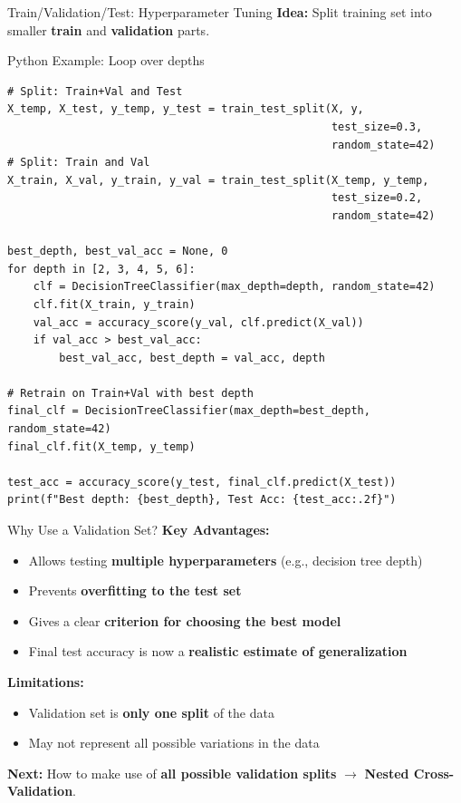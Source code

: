 \documentclass{beamer}
\begin{document}
	\begin{frame}[fragile]{Train/Validation/Test: Hyperparameter Tuning}
\textbf{Idea:} Split training set into smaller \textbf{train} and \textbf{validation} parts.

\begin{block}{Python Example: Loop over depths}
\tiny
\begin{verbatim}
# Split: Train+Val and Test
X_temp, X_test, y_temp, y_test = train_test_split(X, y,
                                                  test_size=0.3,
                                                  random_state=42)
# Split: Train and Val
X_train, X_val, y_train, y_val = train_test_split(X_temp, y_temp,
                                                  test_size=0.2,
                                                  random_state=42)

best_depth, best_val_acc = None, 0
for depth in [2, 3, 4, 5, 6]:
    clf = DecisionTreeClassifier(max_depth=depth, random_state=42)
    clf.fit(X_train, y_train)
    val_acc = accuracy_score(y_val, clf.predict(X_val))
    if val_acc > best_val_acc:
        best_val_acc, best_depth = val_acc, depth

# Retrain on Train+Val with best depth
final_clf = DecisionTreeClassifier(max_depth=best_depth, random_state=42)
final_clf.fit(X_temp, y_temp)

test_acc = accuracy_score(y_test, final_clf.predict(X_test))
print(f"Best depth: {best_depth}, Test Acc: {test_acc:.2f}")
\end{verbatim}
\end{block}
\end{frame}

\begin{frame}{Why Use a Validation Set?}
\textbf{Key Advantages:}
\begin{itemize}
    \item Allows testing \textbf{multiple hyperparameters} (e.g., decision tree depth)
    \item Prevents \textbf{overfitting to the test set}
    \item Gives a clear \textbf{criterion for choosing the best model}
    \item Final test accuracy is now a \textbf{realistic estimate of generalization}
\end{itemize}

\pause
\textbf{Limitations:}
\begin{itemize}
    \item Validation set is \textbf{only one split} of the data
    \item May not represent all possible variations in the data
\end{itemize}

\pause
\textbf{Next:} How to make use of \textbf{all possible validation splits} $\rightarrow$ \textbf{Nested Cross-Validation}.
\end{frame}
\end{document}
